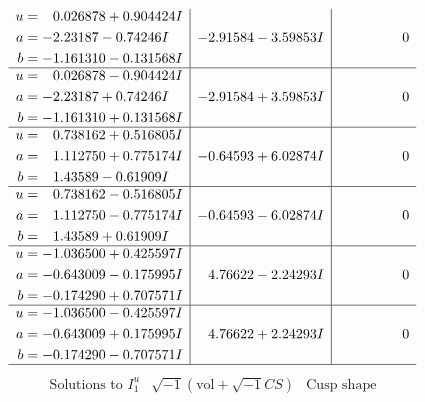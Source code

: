 \documentclass[1p]{elsarticle_modified}
\theoremstyle{definition}
\newcommand{\I}{\sqrt{-1}}
\begin{document}
$$\begin{array}{c|c|c}
\begin{aligned}
u &= \phantom{-}0.026878 + 0.904424 I \\
a &= -2.23187 - 0.74246 I \\
b &= -1.161310 - 0.131568 I\end{aligned}
 & -2.91584 - 3.59853 I & \phantom{-0.000000 } 0 \\ \hline\begin{aligned}
u &= \phantom{-}0.026878 - 0.904424 I \\
a &= -2.23187 + 0.74246 I \\
b &= -1.161310 + 0.131568 I\end{aligned}
 & -2.91584 + 3.59853 I & \phantom{-0.000000 } 0 \\ \hline\begin{aligned}
u &= \phantom{-}0.738162 + 0.516805 I \\
a &= \phantom{-}1.112750 + 0.775174 I \\
b &= \phantom{-}1.43589 - 0.61909 I\end{aligned}
 & -0.64593 + 6.02874 I & \phantom{-0.000000 } 0 \\ \hline\begin{aligned}
u &= \phantom{-}0.738162 - 0.516805 I \\
a &= \phantom{-}1.112750 - 0.775174 I \\
b &= \phantom{-}1.43589 + 0.61909 I\end{aligned}
 & -0.64593 - 6.02874 I & \phantom{-0.000000 } 0 \\ \hline\begin{aligned}
u &= -1.036500 + 0.425597 I \\
a &= -0.643009 - 0.175995 I \\
b &= -0.174290 + 0.707571 I\end{aligned}
 & \phantom{-}4.76622 - 2.24293 I & \phantom{-0.000000 } 0 \\ \hline\begin{aligned}
u &= -1.036500 - 0.425597 I \\
a &= -0.643009 + 0.175995 I \\
b &= -0.174290 - 0.707571 I\end{aligned}
 & \phantom{-}4.76622 + 2.24293 I & \phantom{-0.000000 } 0\\
 \hline 
 \end{array}$$\newpage$$\begin{array}{c|c|c}  
\text{Solutions to }I^u_{1}& \I (\text{vol} + \sqrt{-1}CS) & \text{Cusp shape}\\
 \hline 
\begin{aligned}

\end{aligned}
\end{array}$$
\end{document}
